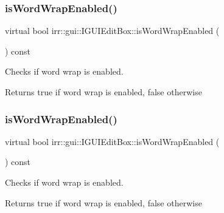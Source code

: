 \subsubsection{\texorpdfstring{is\+Word\+Wrap\+Enabled()}{isWordWrapEnabled()}\hspace{0.1cm}{\footnotesize\ttfamily [1/2]}}
{\footnotesize\ttfamily virtual bool irr\+::gui\+::\+I\+G\+U\+I\+Edit\+Box\+::is\+Word\+Wrap\+Enabled (\begin{DoxyParamCaption}{ }\end{DoxyParamCaption}) const\hspace{0.3cm}{\ttfamily [pure virtual]}}



Checks if word wrap is enabled. 

\begin{DoxyReturn}{Returns}
true if word wrap is enabled, false otherwise 
\end{DoxyReturn}
\mbox{\label{classirr_1_1gui_1_1IGUIEditBox_ad0fd4782c052341744ea9d1f61f80e01}} 
\subsubsection{\texorpdfstring{is\+Word\+Wrap\+Enabled()}{isWordWrapEnabled()}\hspace{0.1cm}{\footnotesize\ttfamily [2/2]}}
{\footnotesize\ttfamily virtual bool irr\+::gui\+::\+I\+G\+U\+I\+Edit\+Box\+::is\+Word\+Wrap\+Enabled (\begin{DoxyParamCaption}{ }\end{DoxyParamCaption}) const\hspace{0.3cm}{\ttfamily [pure virtual]}}



Checks if word wrap is enabled. 

\begin{DoxyReturn}{Returns}
true if word wrap is enabled, false otherwise 
\end{DoxyReturn}
\mbox{\label{classirr_1_1gui_1_1IGUIEditBox_ad0a9db6da9d0594bb3b5b85a673b3e4d}} 
